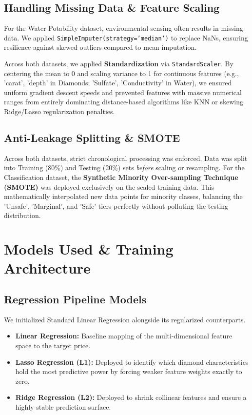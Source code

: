 \documentclass[12pt, a4paper]{article}
\begin{document}
\subsection{Handling Missing Data \& Feature Scaling}
For the Water Potability dataset, environmental sensing often results in missing data. We applied \texttt{SimpleImputer(strategy='median')} to replace NaNs, ensuring resilience against skewed outliers compared to mean imputation. 

Across both datasets, we applied \textbf{Standardization} via \texttt{StandardScaler}. By centering the mean to 0 and scaling variance to 1 for continuous features (e.g., 'carat', 'depth' in Diamonds; 'Sulfate', 'Conductivity' in Water), we ensured uniform gradient descent speeds and prevented features with massive numerical ranges from entirely dominating distance-based algorithms like KNN or skewing Ridge/Lasso regularization penalties.

\subsection{Anti-Leakage Splitting \& SMOTE}
Across both datasets, strict chronological processing was enforced. Data was split into Training (80\%) and Testing (20\%) sets \textit{before} scaling or resampling. For the Classification dataset, the \textbf{Synthetic Minority Over-sampling Technique (SMOTE)} was deployed exclusively on the scaled training data. This mathematically interpolated new data points for minority classes, balancing the 'Unsafe', 'Marginal', and 'Safe' tiers perfectly without polluting the testing distribution.
\section{Models Used \& Training Architecture}

\subsection{Regression Pipeline Models}
We initialized Standard Linear Regression alongside its regularized counterparts.
\begin{itemize}[label=\textcolor{primaryblue}{$\bullet$}]
    \item \textbf{Linear Regression:} Baseline mapping of the multi-dimensional feature space to the target price.
    \item \textbf{Lasso Regression (L1):} Deployed to identify which diamond characteristics hold the most predictive power by forcing weaker feature weights exactly to zero.
    \item \textbf{Ridge Regression (L2):} Deployed to shrink collinear features and ensure a highly stable prediction surface.
\end{itemize}
\end{document}
